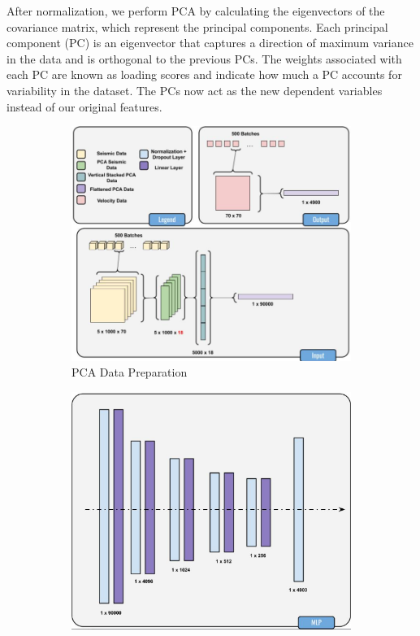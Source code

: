 \documentclass{article}
\begin{document}
After normalization, we perform PCA by calculating the eigenvectors of the covariance matrix, which represent the principal components. Each principal component (PC) is an eigenvector that captures a direction of maximum variance in the data and is orthogonal to the previous PCs. The weights associated with each PC are known as loading scores and indicate how much a PC accounts for variability in the dataset. The PCs now act as the new dependent variables instead of our original features.

\begin{figure}
    \centering
    \begin{subfigure}[b]{0.45\linewidth}
        \centering
        \includegraphics[width=\linewidth]{figures/PCA1.png}
        \caption{PCA Data Preparation}
    \end{subfigure}
    \hfill
    \begin{subfigure}[b]{0.45\linewidth}
        \centering
        \includegraphics[width=\linewidth]{figures/PCA2.png}

\end{subfigure}
\end{figure}
\end{document}
